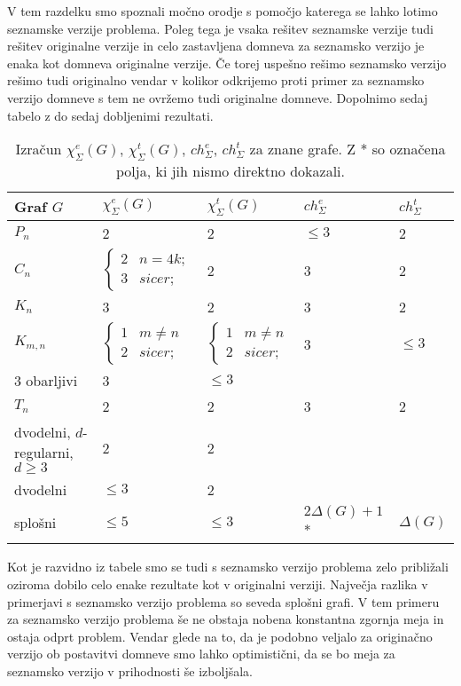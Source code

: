 \documentclass[12pt,a4paper,twoside]{article}
\theoremstyle{definition} %
\theoremstyle{plain} %
\newcommand{\ec}{\chi_{\Sigma}^e}
\newcommand{\ect}{\chi_{\Sigma}^t}
\numberwithin{equation}{section}  %
\begin{document}
V tem razdelku smo spoznali močno orodje s pomočjo katerega se lahko lotimo seznamske verzije problema. Poleg tega je vsaka rešitev seznamske verzije tudi rešitev originalne verzije in celo zastavljena domneva za seznamsko verzijo je enaka kot domneva originalne verzije. Če torej uspešno rešimo seznamsko verzijo rešimo tudi originalno vendar v kolikor odkrijemo proti primer za seznamsko verzijo domneve s tem ne ovržemo tudi originalne domneve. Dopolnimo sedaj tabelo z do sedaj dobljenimi rezultati.
\begin{table}[H]

\caption{\label{tab:tab3} Izračun $\ec(G)$,  $\ect(G)$, $ch_{\Sigma}^e$, $ch_{\Sigma}^t$ za znane grafe. Z * so označena polja, ki jih nismo direktno dokazali.}
\centering
\begin{tabular}{|l|l|l|l|l|}
\hline
 Graf $G$ & $\ec(G)$ & $\ect(G) $ & $ch_{\Sigma}^e$ & $ch_{\Sigma}^t$\\ \hline
 $P_n$ & 2 & 2 & $\le 3$ & 2\\ \hline
 $C_n$ & $\begin{cases}
	2 & n = 4k;\\ 
	3 & sicer;
	\end{cases}$ & 2 & 3 & 2\\ \hline
 $K_n$& 3 & 2 & 3 &2\\ \hline
 $K_{m,n}$& $\begin{cases}
	1 & m \neq n\\ 
	2 & sicer;
	\end{cases}$ &$\begin{cases}
	1 & m \neq n\\ 
	2 & sicer;
	\end{cases}$ &3 & $\le 3$\\ \hline
 3 obarljivi& 3 & $\le 3$& & \\ \hline
$T_n$ & 2 & 2& 3 & 2\\ \hline
dvodelni, $d$-regularni, $d \ge 3 $ & 2  & 2& &\\ \hline
dvodelni   & $\le 3$  & 2 & &\\ \hline
splošni   & $\le 5$  &$ \le 3$ & $ 2\Delta(G) + 1$ * & $\Delta(G)$ \\ \hline
\end{tabular}
\end{table}
Kot je razvidno iz tabele smo se tudi s seznamsko verzijo problema zelo približali oziroma dobilo celo enake rezultate kot v originalni verziji. Največja razlika v primerjavi s seznamsko verzijo problema so seveda splošni grafi. V tem primeru za seznamsko verzijo problema še ne obstaja nobena konstantna zgornja meja in ostaja odprt problem. Vendar glede na to, da je podobno veljalo za originačno verzijo ob postavitvi domneve smo lahko optimistični, da se bo meja za seznamsko verzijo v prihodnosti še izboljšala.
\end{document}
